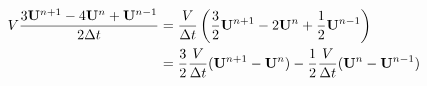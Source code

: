 \documentclass{article}
\begin{document}
\begin{equation}
    \begin{aligned}
        V\frac{3\mathbf{U}^{n+1}-4\mathbf{U}^n+\mathbf{U}^{n-1}}{2\Delta t}
        &=
        \frac{V}{\Delta t}
        \left(
            \frac{3}{2}\mathbf{U}^{n+1}-2\mathbf{U}^n+\frac{1}{2}\mathbf{U}^{n-1}
        \right)
        \\
        &=
        \frac{3}{2}\frac{V}{\Delta t}(\mathbf{U}^{n+1}-\mathbf{U}^n)
        -
        \frac{1}{2}\frac{V}{\Delta t}(\mathbf{U}^{n} - \mathbf{U}^{n-1})
    \end{aligned}
\end{equation}
\end{document}
